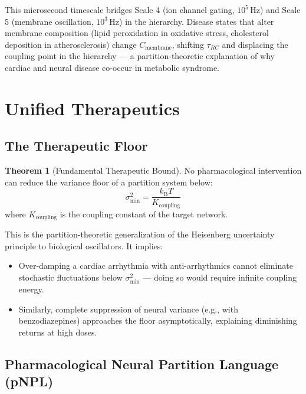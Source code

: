 \documentclass[10pt,twocolumn,a4paper]{article}
\theoremstyle{definition}
\newtheorem{theorem}{Theorem}
\newcommand{\kBT}{k_{\text{B}}T}
\begin{document}
This microsecond timescale bridges Scale 4 (ion channel gating, $10^5$\,Hz) and
Scale 5 (membrane oscillation, $10^3$\,Hz) in the hierarchy. Disease states
that alter membrane composition (lipid peroxidation in oxidative stress,
cholesterol deposition in atherosclerosis) change $C_{\text{membrane}}$,
shifting $\tau_{RC}$ and displacing the coupling point in the hierarchy —
a partition-theoretic explanation of why cardiac and neural disease
co-occur in metabolic syndrome.

\section{Unified Therapeutics}
\label{sec:therapeutics}

\subsection{The Therapeutic Floor}

\begin{theorem}[Fundamental Therapeutic Bound]
No pharmacological intervention can reduce the variance floor of a
partition system below:
\begin{equation}
\boxed{\sigma^2_{\min} = \frac{\kBT}{K_{\text{coupling}}}}
\end{equation}
where $K_{\text{coupling}}$ is the coupling constant of the target network.
\end{theorem}

This is the partition-theoretic generalization of the Heisenberg uncertainty
principle to biological oscillators. It implies:
\begin{itemize}
\item Over-damping a cardiac arrhythmia with anti-arrhythmics cannot
  eliminate stochastic fluctuations below $\sigma^2_{\min}$ — doing so
  would require infinite coupling energy.
\item Similarly, complete suppression of neural variance (e.g., with
  benzodiazepines) approaches the floor asymptotically, explaining
  diminishing returns at high doses.
\end{itemize}

\subsection{Pharmacological Neural Partition Language (pNPL)}
\end{document}
